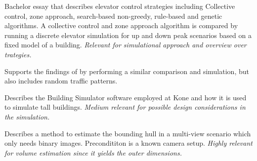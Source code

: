 


Bachelor essay that describes elevator control strategies including
Collective control, zone approach, search-based non-greedy, rule-based and genetic algorithms. A collective control and zone approach algorithm is compared by running a discrete elevator simulation for up and down peak scenarios based on a fixed model of a building. \emph{Relevant for simulational approach and overview over trategies.}


Supports the findings of \textcite{axelsson2013strategies} by performing a similar comparison and simulation, but also includes random traffic patterns. 



Describes the Building Simulator software employed at Kone and how it is used to simulate tall buildings.
\emph{Medium relevant for possible design considerations in the simulation.}

Describes a method to estimate the bounding hull in a multi-view scenario
which only needs binary images.
Precondititon is a known camera setup.
\emph{Highly relevant for volume estimation since it yields the outer dimensions.}

